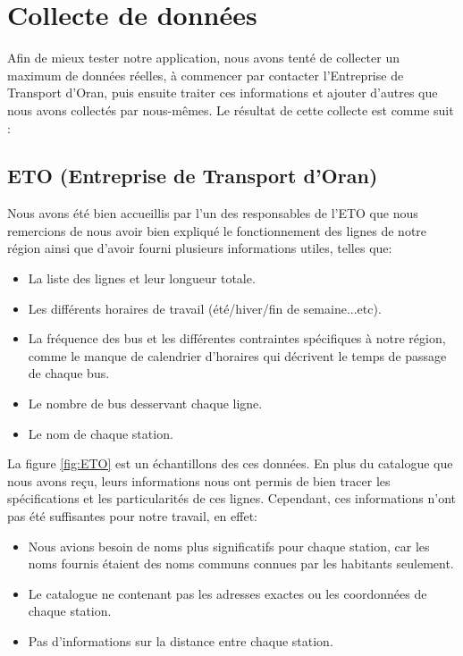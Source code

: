 \section{Collecte de données}
Afin de mieux tester notre application, nous avons tenté de collecter un maximum de données réelles, à commencer par contacter l'Entreprise de Transport d'Oran, puis ensuite traiter ces informations et ajouter d'autres que nous avons collectés par nous-mêmes.
Le résultat de cette collecte est comme suit :

\subsection{ETO (Entreprise de Transport d'Oran)}

Nous avons été bien accueillis par l'un des responsables de l'ETO que nous remercions de nous avoir bien expliqué le fonctionnement des lignes de notre région ainsi que d'avoir fourni plusieurs informations utiles, telles que:
\begin{itemize}
	\item La liste des lignes et leur longueur totale.
	\item Les différents horaires de travail (été/hiver/fin de semaine...etc).
	\item La fréquence des bus et les différentes contraintes spécifiques à notre région, comme le manque de calendrier d'horaires qui décrivent le temps de passage de chaque bus.
	\item Le nombre de bus desservant chaque ligne.
	\item Le nom de chaque station.
\end{itemize}

La figure \ref{fig:ETO} est un échantillons des ces données.\newline
En plus du catalogue que nous avons reçu, leurs informations nous ont permis de bien tracer les spécifications et les particularités de ces lignes.
Cependant, ces informations n'ont pas été suffisantes pour notre travail, en effet:
	\begin{itemize}
	\item Nous avions besoin de noms plus significatifs pour chaque station, car les noms fournis étaient des noms communs connues par les habitants seulement.
	\item Le catalogue ne contenant pas les adresses exactes ou les coordonnées de chaque station.
	\item Pas d'informations sur la distance entre chaque station.
	\end{itemize}
	
